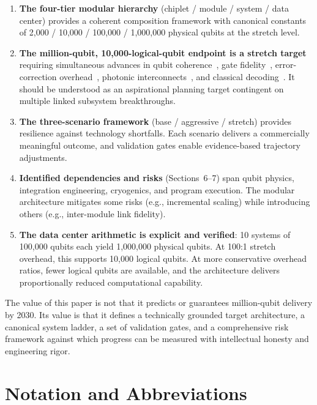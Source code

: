 \documentclass[conference]{IEEEtran}
\begin{document}
\begin{enumerate}
\item \textbf{The four-tier modular hierarchy} (chiplet / module / system / data center) provides a coherent composition framework with canonical constants of 2,000 / 10,000 / 100,000 / 1,000,000 physical qubits at the stretch level.

\item \textbf{The million-qubit, 10,000-logical-qubit endpoint is a stretch target} requiring simultaneous advances in qubit coherence~\cite{bland2025}, gate fidelity~\cite{acharya2024}, error-correction overhead~\cite{bravyi2024, fowler2012, panteleev2022}, photonic interconnects~\cite{monroe2014}, and classical decoding~\cite{krinner2022}. It should be understood as an aspirational planning target contingent on multiple linked subsystem breakthroughs.

\item \textbf{The three-scenario framework} (base / aggressive / stretch) provides resilience against technology shortfalls. Each scenario delivers a commercially meaningful outcome, and validation gates enable evidence-based trajectory adjustments.

\item \textbf{Identified dependencies and risks} (Sections~6--7) span qubit physics, integration engineering, cryogenics, and program execution. The modular architecture mitigates some risks (e.g., incremental scaling) while introducing others (e.g., inter-module link fidelity).

\item \textbf{The data center arithmetic is explicit and verified}: 10 systems of 100,000 qubits each yield 1,000,000 physical qubits. At 100:1 stretch overhead, this supports 10,000 logical qubits. At more conservative overhead ratios, fewer logical qubits are available, and the architecture delivers proportionally reduced computational capability.
\end{enumerate}

The value of this paper is not that it predicts or guarantees million-qubit delivery by 2030. Its value is that it defines a technically grounded target architecture, a canonical system ladder, a set of validation gates, and a comprehensive risk framework against which progress can be measured with intellectual honesty and engineering rigor.

\appendices

\section{Notation and Abbreviations}
\end{document}
